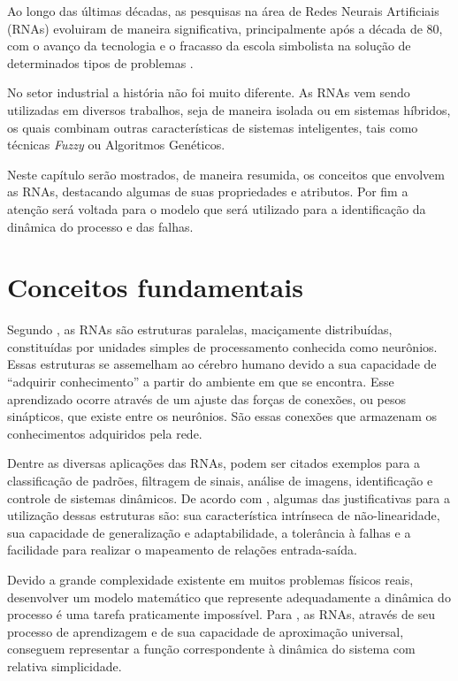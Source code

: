 \label{cap:rnas}

Ao longo das últimas décadas, as pesquisas na área de Redes Neurais Artificiais
(RNAs) evoluiram de maneira significativa, principalmente após a década de 80,
com o avanço da tecnologia e o fracasso da escola simbolista na solução de
determinados tipos de problemas \cite{braga:2007}.

No setor industrial a história não foi muito diferente. As RNAs vem sendo
utilizadas em diversos trabalhos, seja de maneira isolada ou em sistemas
híbridos, os quais combinam outras características de sistemas inteligentes,
tais como técnicas {\it Fuzzy} ou Algoritmos Genéticos.

Neste capítulo serão mostrados, de maneira resumida, os conceitos que envolvem
as RNAs, destacando algumas de suas propriedades e atributos. Por fim a atenção
será voltada para o modelo que será utilizado para a identificação da dinâmica
do processo e das falhas.

\section{Conceitos fundamentais}
Segundo , as RNAs são estruturas paralelas, maciçamente
distribuídas, constituídas por unidades simples de processamento conhecida como
neurônios. Essas estruturas se assemelham ao cérebro humano devido a sua
capacidade de ``adquirir conhecimento'' a partir do ambiente em que se encontra.
Esse aprendizado ocorre através de um ajuste das forças de conexões, ou pesos
sinápticos, que existe entre os neurônios. São essas conexões que armazenam os
conhecimentos adquiridos pela rede.

Dentre as diversas aplicações das RNAs, podem ser citados exemplos para a
classificação de padrões, filtragem de sinais, análise de imagens, identificação
e controle de sistemas dinâmicos. De acordo com ,
algumas das justificativas para a utilização dessas estruturas são: sua
característica intrínseca de não-linearidade, sua capacidade de generalização e
adaptabilidade, a tolerância à falhas e a facilidade para realizar o mapeamento
de relações entrada-saída.

Devido a grande complexidade existente em muitos problemas físicos reais,
desenvolver um modelo matemático que represente adequadamente a dinâmica do
processo é uma tarefa praticamente impossível. Para ,
as RNAs, através de seu processo de aprendizagem e de sua capacidade de
aproximação universal, conseguem representar a função correspondente à dinâmica
do sistema com relativa simplicidade.

